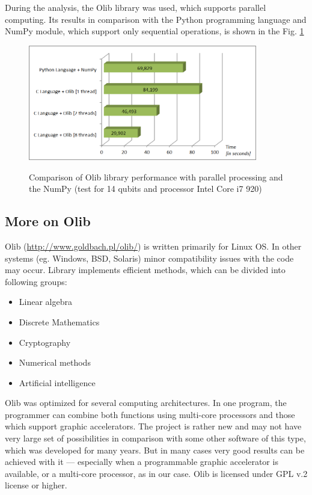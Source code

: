 \documentclass[10pt, a5paper]{article}
\begin{document}
During the analysis, the Olib library was used, which supports parallel computing. Its results in comparison with the Python programming language and NumPy module, which support only sequential operations, is shown in the Fig. \ref{lf6}

\begin{figure}
  \centering
  \includegraphics[width=10cm]{18_2012_6.png}
\label{lf6}
\caption{Comparison of Olib library performance with parallel processing and the NumPy (test for 14 qubits and processor Intel Core i7 920)}
\end{figure}

\subsection*{More on Olib}

Olib (\url{http://www.goldbach.pl/olib/}) is written primarily for Linux OS. In other systems (eg. Windows, BSD, Solaris) minor compatibility issues with the code may occur. Library implements efficient methods, which can be divided into following groups:

\begin{itemize}
  \item Linear algebra
  \item Discrete Mathematics
  \item Cryptography
  \item Numerical methods
  \item Artificial intelligence
\end{itemize}

Olib was optimized for several computing architectures. In one program, the programmer can combine both functions using multi-core processors and those which support graphic accelerators. The project is rather new and may not have very large set of possibilities in comparison with some other software of this type, which was developed for many years. But in many cases very good results can be achieved with it --- especially when a programmable graphic accelerator is available, or a multi-core processor, as in our case. Olib is licensed under GPL v.2 license or higher.
\end{document}
